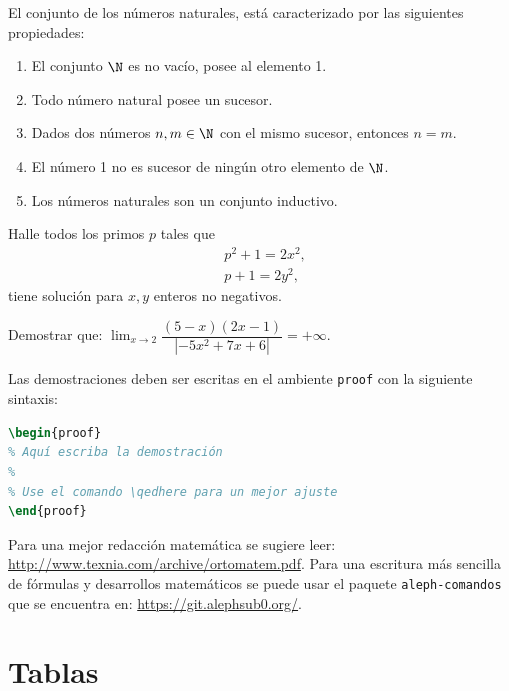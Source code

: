 \documentclass{aleph-revista}
\begin{document}
\begin{axioma}
    El conjunto de los números naturales, está caracterizado por las siguientes propiedades:
    \begin{enumerate}
    \item
        El conjunto $\N$ es no vacío, posee al elemento 1.
    \item
        Todo número natural posee un sucesor.
    \item
        Dados dos números $n,m\in\N$ con el mismo sucesor, entonces $n=m$.
    \item
        El número 1 no es sucesor de ningún otro elemento de $\N$.
    \item
        Los números naturales son un conjunto inductivo.
    \end{enumerate}
\end{axioma}

\begin{ejer}
Halle todos los primos $p$ tales que
\begin{align}
    & p^{2}+1=2x^{2},\\
    & p+1=2y^{2},
\end{align}
tiene solución para $x, y$ enteros no negativos.
\end{ejer}

\begin{ejem}
    Demostrar que: $\displaystyle\lim_{x\to 2}\dfrac{(5-x)(2x-1)}{|-5x^2+7x+6|}=+\infty$.
\end{ejem}

Las demostraciones deben ser escritas en el ambiente \texttt{proof} con la siguiente sintaxis:

\begin{lstlisting}[language=TeX]
\begin{proof}
% Aquí escriba la demostración
%
% Use el comando \qedhere para un mejor ajuste
\end{proof}
\end{lstlisting}

Para una mejor redacción matemática se sugiere leer: \url{http://www.texnia.com/archive/ortomatem.pdf}. Para una escritura más sencilla de fórmulas y desarrollos matemáticos se puede usar el paquete \texttt{aleph-comandos} que se encuentra en: \url{https://git.alephsub0.org/}. 

\section{Tablas}
\end{document}
